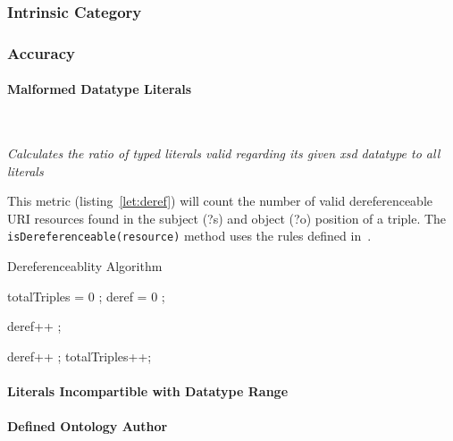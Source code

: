 
\subsubsection{Intrinsic Category}
\label{sec:Intrinsic} 


\subsubsection{Accuracy} %

\paragraph{Malformed Datatype Literals} ~\\ %
\begin{mdframed}[style=metricdefinition]
\emph{Calculates the ratio of typed literals valid regarding its given xsd datatype to all literals}
\end{mdframed}


This metric (listing~\ref{let:deref}) will count the number of valid dereferenceable URI resources found in the subject (?s) and object (?o) position of a triple. The \texttt{isDereferenceable(resource)} method uses the rules defined in~\cite{Yang2011}.
\begin{algorithm}
\caption{Dereferenceablity Algorithm}\label{lst:deref}
\begin{algorithmic}[1]
\State totalTriples = 0 ;
\State deref = 0 ;
\EndProcedure

 deref++ ; \EndIf

 deref++ ; \EndIf
\State totalTriples++;
\EndProcedure
\end{algorithmic}
\end{algorithm}

\paragraph{Literals Incompartible with Datatype Range} 
\paragraph{Defined Ontology Author}
